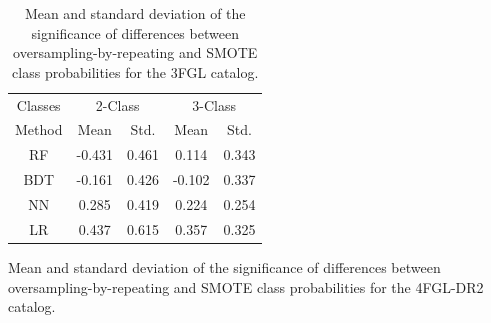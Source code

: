 \documentclass{aa}
\begin{document}
\begin{appendix}
\begin{table}[!h]
\caption{
Mean and standard deviation of the significance of differences between 
oversampling-by-repeating and SMOTE class probabilities for the 3FGL catalog.
}
\label{tab:OvsS_3FGL}

\tiny
\centering
\renewcommand{\tabcolsep}{1mm}
\renewcommand{\arraystretch}{1.3}

\begin{tabular}{c c c c c }
\hline
\hline
Classes&\multicolumn{2}{c}{2-Class}&\multicolumn{2}{c}{3-Class}\\
Method & Mean&Std.&Mean&Std.\\
\hline
RF& -0.431 & 0.461&0.114&0.343\\
\hline
BDT&-0.161&0.426 &-0.102&0.337\\
\hline
NN&0.285&0.419&0.224&0.254\\
\hline
LR&0.437&0.615&0.357&0.325\\
\end{tabular}
\vspace{2mm}
\end{table}


\begin{table}[!h]
\caption{
Mean and standard deviation of the significance of differences between 
oversampling-by-repeating and SMOTE class probabilities for the 4FGL-DR2 catalog.
}
\label{tab:OvsS_4FGL}

\tiny
\centering
\renewcommand{\tabcolsep}{1mm}
\renewcommand{\arraystretch}{1.3}


\end{table}
\end{appendix}
\end{document}
